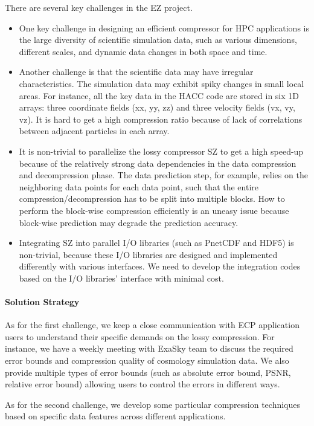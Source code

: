 There are several key challenges in the EZ project.
\begin{itemize}
\item One key challenge in designing an efficient compressor for HPC applications is the large
diversity of scientific simulation data, such as various dimensions, different scales, and dynamic data changes in both
space and time.
\item Another challenge is that the scientific data may have irregular characteristics. The simulation data may exhibit spiky changes in small local areas. For instance, all the key data in the HACC code are stored in six 1D arrays: three coordinate fields (xx, yy, zz) and three velocity fields (vx, vy, vz). It is hard to get a high compression ratio because of lack of correlations between adjacent particles in each array.
\item It is non-trivial to parallelize the lossy compressor SZ to get a high speed-up because of the relatively strong data dependencies in the data compression and decompression phase. The data prediction step, for example, relies on the neighboring data points for each data point, such that the entire compression/decompression has to be split into multiple blocks. How to perform the block-wise compression efficiently is an uneasy issue because block-wise prediction may degrade the prediction accuracy.
\item Integrating SZ into parallel I/O libraries (such as PnetCDF and HDF5) is non-trivial, because these I/O libraries are designed and implemented differently with various interfaces. We need to develop the integration codes based on the I/O libraries' interface with minimal cost.
\end{itemize}

\paragraph{Solution Strategy}

As for the first challenge, we keep a close communication with ECP application users to understand their specific demands on the lossy compression. For instance, we have a weekly meeting with ExaSky team to discuss the required error bounds and compression quality of cosmology simulation data. We also provide multiple types of error bounds (such as absolute error bound, PSNR, relative error bound) allowing users to control the errors in different ways.

As for the second challenge, we develop some particular compression techniques based on specific data features across different applications.

